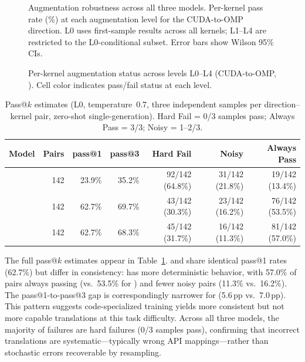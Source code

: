\begin{figure}[t]
\centering

\caption{Augmentation robustness across all three models. Per-kernel pass rate (\%) at each augmentation level for the CUDA-to-OMP direction. L0 uses first-sample results across all kernels; L1--L4 are restricted to the L0-conditional subset. Error bars show Wilson 95\% CIs.}
\label{fig:augmentation}
\end{figure}

\begin{figure}[t]
  \centering
  
  \caption{Per-kernel augmentation status across levels L0--L4 (CUDA-to-OMP, \qwenshort{}). Cell color indicates pass/fail status at each level.}
  \label{fig:aug-heatmap}
\end{figure}

\begin{table}[t]
\centering
\caption{Pass@$k$ estimates (L0, temperature~0.7, three independent samples per direction--kernel pair, zero-shot single-generation). Hard Fail = 0/3 samples pass; Always Pass = 3/3; Noisy = 1--2/3.}
\label{tab:pass-at-k}
\small
\begin{tabular}{@{}lrrrrrr@{}}
\toprule
Model & Pairs & pass@1 & pass@3 & Hard Fail & Noisy & Always Pass \\
\midrule
\qwenshort{} & 142 & 23.9\% & 35.2\% & 92/142 (64.8\%) & 31/142 (21.8\%) & 19/142 (13.4\%) \\
\gptnew{} & 142 & 62.7\% & 69.7\% & 43/142 (30.3\%) & 23/142 (16.2\%) & 76/142 (53.5\%) \\
\codex{} & 142 & 62.7\% & 68.3\% & 45/142 (31.7\%) & 16/142 (11.3\%) & 81/142 (57.0\%) \\
\bottomrule
\end{tabular}
\end{table}

The full pass@$k$ estimates appear in Table~\ref{tab:pass-at-k}. \gptnew{} and \codex{} share identical pass@1 rates (62.7\%) but differ in consistency: \codex{} has more deterministic behavior, with 57.0\% of pairs always passing (vs.\ 53.5\% for \gptnew{}) and fewer noisy pairs (11.3\% vs.\ 16.2\%). The pass@1-to-pass@3 gap is correspondingly narrower for \codex{} (5.6\,pp vs.\ 7.0\,pp). This pattern suggests code-specialized training yields more consistent but not more capable translations at this task difficulty. Across all three models, the majority of failures are hard failures (0/3 samples pass), confirming that incorrect translations are systematic---typically wrong API mappings---rather than stochastic errors recoverable by resampling.

